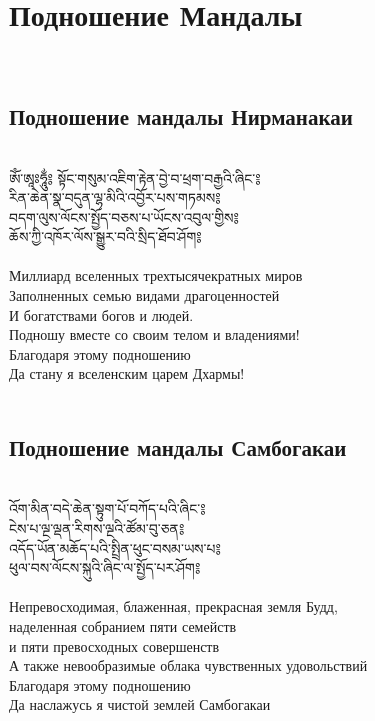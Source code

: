 \section{Подношение Мандалы}
\\
\subsection{Подношение мандалы Нирманакаи}
\\
\ti
ཨོཾ་ཨཱཿཧཱུྂ༔ སྟོང་གསུམ་འཇིག་རྟེན་བྱེ་བ་ཕྲག་བརྒྱའི་ཞིང་༔\\
རིན་ཆེན་སྣ་བདུན་ལྷ་མིའི་འབྱོར་པས་གཏམས༔ \\
བདག་ལུས་ལོངས་སྤྱོད་བཅས་པ་ཡོངས་འབུལ་གྱིས༔ \\
ཆོས་ཀྱི་འཁོར་ལོས་སྒྱུར་བའི་སྲིད་ཐོབ་ཤོག༔ \\
\\
\ru
Миллиард вселенных трехтысячекратных миров\\
Заполненных семью видами драгоценностей\\
И богатствами богов и людей.\\
Подношу вместе со своим телом и владениями!\\
Благодаря этому подношению\\
Да стану я вселенским царем Дхармы!\\
\\
\subsection{Подношение мандалы Самбогакаи}
\\
\ti
འོག་མིན་བདེ་ཆེན་སྟུག་པོ་བཀོད་པའི་ཞིང་༔ \\
ངེས་པ་ལྔ་ལྡན་རིགས་ལྔའི་ཚོམ་བུ་ཅན༔  \\
འདོད་ཡོན་མཆོད་པའི་སྤྲིན་ཕུང་བསམ་ཡས་པ༔ \\
ཕུལ་བས་ལོངས་སྐུའི་ཞིང་ལ་སྤྱོད་པར་ཤོག༔ \\
\\
\ru
Непревосходимая, блаженная, прекрасная земля Будд,\\
наделенная собранием пяти семейств\\
и пяти превосходных совершенств\\
А также невообразимые облака чувственных удовольствий\\
Благодаря этому подношению\\
Да наслажусь я чистой землей Самбогакаи\\
\\
